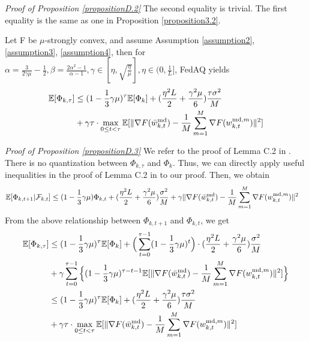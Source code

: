 \documentclass[11pt]{article}
\begin{document}
\emph{Proof of Proposition \ref{propositionD.2}} \textrm{ } The second equality is trivial. The first equality is the same as one in Proposition \ref{proposition3.2}.

\begin{proposition} \label{propositionD.3}
Let F be $\mu$-strongly convex, and assume Assumption \ref{assumption2}, \ref{assumption3}, \ref{assumption4}, then for $\alpha=\frac{3}{2\gamma\mu} - \frac{1}{2}, \beta=\frac{2\alpha^2-1}{\alpha-1}, \gamma \in [\eta, \sqrt{\frac{\eta}{\mu}}], \eta \in (0, \frac{1}{L}]$, FedAQ yields
\begin{align*}
    \mathbb{E}[\Phi_{k, \tau}] &\leq (1-\frac{1}{3}\gamma\mu)^\tau \mathbb{E}[\Phi_k] + (\frac{\eta^2 L}{2} + \frac{\gamma^2\mu}{6})\frac{\tau\sigma^2}{M} \\
    &+ \gamma\tau \cdot \max_{0\leq t <\tau} \mathbb{E}[\|\nabla F(\Bar{w}_{k, t}^{\textrm{md}}) - \frac{1}{M} \sum_{m=1}^M \nabla F(w_{k, t}^{\textrm{md}, m})\|^2]
\end{align*}
\end{proposition}

\emph{Proof of Proposition \ref{propositionD.3}} \textrm{ } We refer to the proof of Lemma C.2 in \cite{Yeojoon-yuan2020federated}. There is no quantization between $\Phi_{k, \tau}$ and $\Phi_k$. Thus, we can directly apply useful inequalities in the proof of Lemma C.2 in \cite{Yeojoon-yuan2020federated} to our proof. Then, we obtain
\begin{align*}
    \mathbb{E}[\Phi_{k, t+1}|\mathcal{F}_{k, t}] &\leq (1-\frac{1}{3}\gamma\mu) \Phi_{k, t} + (\frac{\eta^2 L}{2} + \frac{\gamma^2\mu}{6})\frac{\sigma^2}{M} + \gamma\|\nabla F(\Bar{w}_{k, t}^{\textrm{md}}) - \frac{1}{M} \sum_{m=1}^M \nabla F(w_{k, t}^{\textrm{md}, m})\|^2
\end{align*}
From the above relationship between $\Phi_{k, t+1}$ and $\Phi_{k, t}$, we get
\begin{align*}
    \mathbb{E}[\Phi_{k, \tau}] &\leq (1-\frac{1}{3}\gamma\mu)^\tau \mathbb{E}[\Phi_k] + \Big(\sum_{t=0}^{\tau-1} (1-\frac{1}{3}\gamma\mu)^t \Big)\cdot(\frac{\eta^2 L}{2} + \frac{\gamma^2\mu}{6})\frac{\sigma^2}{M} \\
    &+ \gamma \sum_{t=0}^{\tau-1} \Big\{ (1-\frac{1}{3}\gamma\mu)^{\tau-t-1} \mathbb{E}[\|\nabla F(\Bar{w}_{k, t}^{\textrm{md}}) - \frac{1}{M} \sum_{m=1}^M \nabla F(w_{k, t}^{\textrm{md}, m})\|^2]\Big\} \\
    &\leq (1-\frac{1}{3}\gamma\mu)^\tau \mathbb{E}[\Phi_k] + (\frac{\eta^2 L}{2} + \frac{\gamma^2\mu}{6})\frac{\tau\sigma^2}{M} \\
    &+ \gamma\tau \cdot \max_{0\leq t <\tau} \mathbb{E}[\|\nabla F(\Bar{w}_{k, t}^{\textrm{md}}) - \frac{1}{M} \sum_{m=1}^M \nabla F(w_{k, t}^{\textrm{md}, m})\|^2]
\end{align*}
\end{document}
